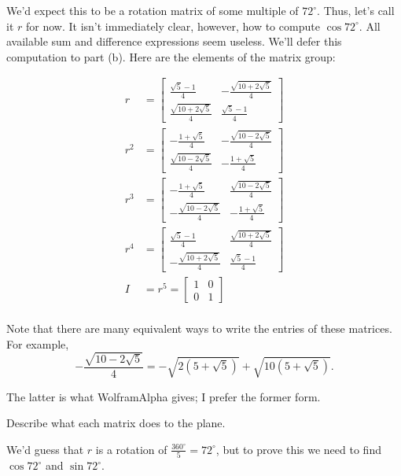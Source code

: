 \documentclass[../key.tex]{subfiles}
\begin{document}
We'd expect this to be a rotation matrix of some multiple of $72^\circ$. Thus, let's call it $r$ for now. It isn't immediately clear, however, how to compute $\cos 72^\circ$. All available sum and difference expressions seem useless. We'll defer this computation to part (b). Here are the elements of the matrix group:

\begin{align*}
r &= \begin{bmatrix} \frac{\sqrt{5}-1}{4} & -\frac{\sqrt{10+2\sqrt{5}}}{4} \\ \frac{\sqrt{10+2\sqrt{5}}}{4} & \frac{\sqrt{5}-1}{4} \end{bmatrix} \\
r^2 &= \begin{bmatrix} -\frac{1+\sqrt{5}}{4} & -\frac{\sqrt{10-2\sqrt{5}}}{4} \\ \frac{\sqrt{10-2\sqrt{5}}}{4} & -\frac{1+\sqrt{5}}{4} \end{bmatrix} \\
r^3 &= \begin{bmatrix} -\frac{1+\sqrt{5}}{4} & \frac{\sqrt{10-2\sqrt{5}}}{4} \\ -\frac{\sqrt{10-2\sqrt{5}}}{4} & -\frac{1+\sqrt{5}}{4} \end{bmatrix} \\
r^4 &= \begin{bmatrix} \frac{\sqrt{5}-1}{4} & \frac{\sqrt{10+2\sqrt{5}}}{4} \\ -\frac{\sqrt{10+2\sqrt{5}}}{4} & \frac{\sqrt{5}-1}{4} \end{bmatrix} \\
I &= r^5 = \begin{bmatrix} 1 & 0 \\ 0 & 1 \end{bmatrix} \\
\end{align*}

Note that there are many equivalent ways to write the entries of these matrices. For example, $$-\frac{\sqrt{10-2\sqrt{5}}}{4} = -\sqrt{2\left(5+\sqrt{5}\right)}+\sqrt{10\left(5+\sqrt{5}\right)}.$$

The latter is what WolframAlpha gives; I prefer the former form.

\begin{iinner_problem}
\item Describe what each matrix does to the plane.
\end{iinner_problem}

We'd guess that $r$ is a rotation of $\frac{360^\circ}{5} = 72^\circ$, but to prove this we need to find $\cos 72^\circ$ and $\sin 72^\circ$.
\end{document}

